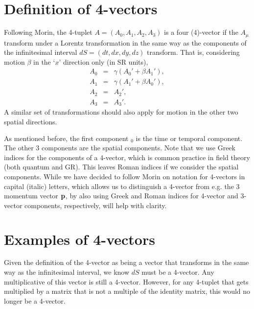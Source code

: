 \documentclass[12pt]{article}
\newcommand{\be}{\begin{eqnarray}}
\newcommand{\ee}{\end{eqnarray}}
\begin{document}
\section{Definition of 4-vectors}\label{sec:definition}

Following Morin, the 4-tuplet $A= (A_0, A_1, A_2, A_3)$ is a four (4)-vector if the $A_{\mu}$ transform under a Lorentz transformation in the same way as the components of the infinitesimal interval $d S = (dt, dx, dy,dz)$ transform. That is, considering motion $\beta$ in the `$x$' direction only (in SR units), 
\be
A_0 &=& \gamma (A_0' + \beta A_1'),\nonumber \\
A_1 &=& \gamma (A_1' + \beta A_0'), \nonumber \\
A_2 &=& A_2', \nonumber \\ 
A_3 &=& A_3'. 
\ee
A similar set of transformations should also apply for motion in the other two spatial directions. 

As mentioned before, the first component $_0$ is the time or temporal component. The other 3 components are the spatial components. Note that we use Greek indices for the components of a 4-vector, which is common practice in field theory (both quantum and GR). This leaves Roman indices if we consider the spatial components. While we have decided to follow Morin on notation for 4-vectors in capital (italic) letters, which allows us to distinguish a 4-vector from e.g. the 3 momentum vector ${\bf p}$, by also using Greek and Roman indices for 4-vector and 3-vector components, respectively, will help with clarity. 

\section{Examples of 4-vectors}\label{sec:examples}
Given the definition of the 4-vector as being a vector that transforms in the same way as the infinitesimal interval, we know $dS$ must be a 4-vector. Any multiplicative of this vector is still a 4-vector. However, for any 4-tuplet that gets multiplied by a matrix that is not a multiple of the identity matrix, this would no longer be a 4-vector. 
\end{document}
